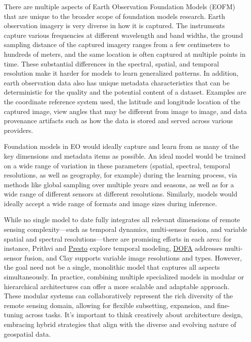 \documentclass[
  letterpaper,
  DIV=11,
  numbers=noendperiod]{scrreprt}
\begin{document}
There are multiple aspects of Earth Observation Foundation Models (EOFM)
that are unique to the broader scope of foundation models research.
Earth observation imagery is very diverse in how it is captured. The
instruments capture various frequencies at different wavelength and band
widths, the ground sampling distance of the captured imagery ranges from
a few centimeters to hundreds of meters, and the same location is often
captured at multiple points in time. These substantial differences in
the spectral, spatial, and temporal resolution make it harder for models
to learn generalized patterns. In addition, earth observation data also
has unique metadata characteristics that can be deterministic for the
quality and the potential content of a dataset. Examples are the
coordinate reference system used, the latitude and longitude location of
the captured image, view angles that may be different from image to
image, and data provenance artifacts such as how the data is stored and
served across various providers.

Foundation models in EO would ideally capture and learn from as many of
the key dimensions and metadata items as possible. An ideal model would
be trained on a wide range of variation in these parameters (spatial,
spectral, temporal resolutions, as well as geography, for example)
during the learning process, via methods like global sampling over
multiple years and seasons, as well as for a wide range of different
sensors at different resolutions. Similarly, models would ideally accept
a wide range of formats and image sizes during inference.

While no single model to date fully integrates all relevant dimensions
of remote sensing complexity---such as temporal dynamics, multi-sensor
fusion, and variable spatial and spectral resolutions---there are
promising efforts in each area: for instance, Prithvi and
\href{https://doi.org/10.48550/arXiv.2304.14065}{Presto} explore
temporal modeling,
\href{https://doi.org/10.48550/arXiv.2403.15356}{DOFA} addresses
multi-sensor fusion, and Clay supports variable image resolutions and
types. However, the goal need not be a single, monolithic model that
captures all aspects simultaneously. In practice, combining multiple
specialized models in modular or hierarchical architectures can offer a
more scalable and adaptable approach. These modular systems can
collaboratively represent the rich diversity of the remote sensing
domain, allowing for flexible subsetting, expansion, and fine-tuning
across tasks. It's important to think creatively about architecture
design, embracing hybrid strategies that align with the diverse and
evolving nature of geospatial data.
\end{document}
